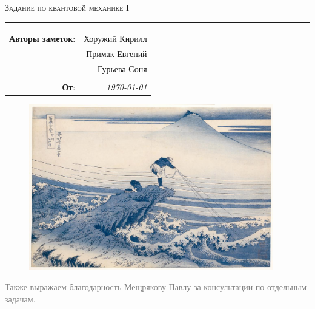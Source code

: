 
\begin{center}
    \LARGE \textsc{Задание по квантовой механике I}
\end{center}

\hrule

\phantom{42}

\begin{flushright}
    \begin{tabular}{rr}
        \textbf{Авторы заметок}: 
        & Хоружий Кирилл \\
        & Примак Евгений \\
        & Гурьева Соня \\
        & \\
        \textbf{От}: &
        \textit{\today}\\
    \end{tabular}
\end{flushright}

\thispagestyle{empty}
\tableofcontents

\vspace*{\fill}
\begin{figure}[h]
    \centering
    \includegraphics[width=0.95\textwidth]{figures/pic1.jpeg}
\end{figure}

\begin{flushright}
    \textcolor{gray}{
    \small{Также выражаем благодарность Мещрякову Павлу за консультации по отдельным задачам.}}
\end{flushright}
\newpage

